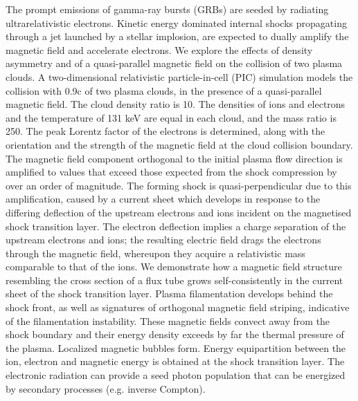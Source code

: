 \documentclass[structabstract]{aa}
\begin{document}
\abstract
{The prompt emissions of gamma-ray bursts (GRBs) are seeded by radiating ultrarelativistic electrons. Kinetic 
energy dominated internal shocks propagating through a jet launched by a stellar implosion, are expected
to dually amplify the magnetic field and accelerate electrons.
}
{We explore the effects of density asymmetry and of a quasi-parallel magnetic field on the collision of two plasma clouds.}
{A two-dimensional relativistic particle-in-cell (PIC) simulation models the collision with 0.9c of two plasma 
clouds, in the presence of a quasi-parallel magnetic field. The cloud density ratio is 10. The densities of ions 
and electrons and the temperature of 131 keV are equal in each cloud, and the mass ratio is 250. The peak Lorentz 
factor of the electrons is determined, along with the orientation and the strength of the magnetic field at the 
cloud collision boundary.}
{The magnetic field component orthogonal to the initial plasma flow direction is amplified to values that exceed 
those expected from the shock compression by over an order of magnitude. The forming shock is quasi-perpendicular 
due to this amplification, caused by a current sheet which develops in response to the differing
deflection of the upstream electrons and ions incident on the magnetised shock transition layer. The 
electron deflection implies a charge separation of the upstream electrons and ions; the resulting electric field 
drags the electrons through the magnetic field, whereupon they acquire a relativistic mass comparable to that of the 
ions. We demonstrate how a magnetic field structure resembling the cross section of a flux tube grows 
self-consistently in the current sheet of the shock transition layer. Plasma filamentation develops behind the 
shock front, as well as signatures of orthogonal magnetic field striping, indicative of the filamentation instability. 
These magnetic fields convect away from the shock boundary and their energy density exceeds by far the thermal 
pressure of the plasma. Localized magnetic bubbles form.}
{
Energy equipartition between the ion, electron and magnetic energy is obtained at the shock transition layer.
The electronic radiation can provide a seed photon population that can be energized by secondary processes (e.g. inverse Compton).
}   



\end{document}
